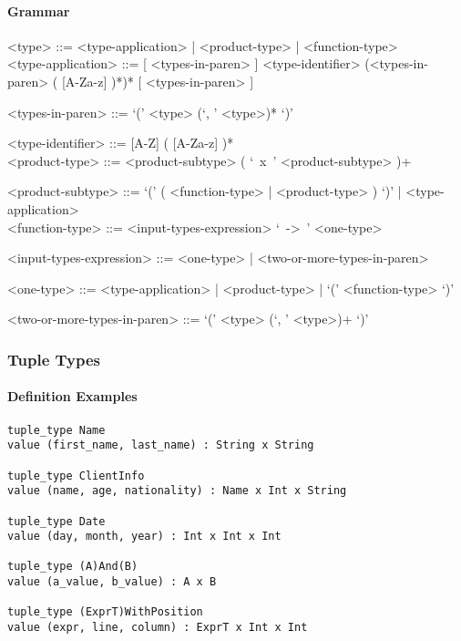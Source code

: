 \documentclass{article}
\begin{document}
\paragraph{Grammar}
\begin{grammar}
<type> ::= <type-application> | <product-type> | <function-type> \\

<type-application> ::=
[ <types-in-paren> ] <type-identifier> (<types-in-paren> ( [A-Za-z] )*)* [ <types-in-paren> ] 

<types-in-paren> ::= `(' <type> (`, ' <type>)* `)'

<type-identifier> ::= [A-Z] ( [A-Za-z] )* \\ 
 
<product-type> ::= <product-subtype> ( `\ x\ ' <product-subtype> )+

<product-subtype> ::=
`(' ( <function-type> | <product-type> ) `)' | <type-application> \\

<function-type> ::= <input-types-expression> `\ ->\ ' <one-type>

<input-types-expression> ::= <one-type> | <two-or-more-types-in-paren>

<one-type> ::= <type-application> | <product-type> | `(' <function-type> `)'

<two-or-more-types-in-paren> ::=  `(' <type> (`, ' <type>)+ `)'
\end{grammar}

\subsubsection{Tuple Types}
\label{subsec:tupts}

\paragraph{Definition Examples}

\begin{verbatim}
tuple_type Name
value (first_name, last_name) : String x String

tuple_type ClientInfo
value (name, age, nationality) : Name x Int x String

tuple_type Date
value (day, month, year) : Int x Int x Int

tuple_type (A)And(B)
value (a_value, b_value) : A x B

tuple_type (ExprT)WithPosition
value (expr, line, column) : ExprT x Int x Int
\end{verbatim}
\end{document}
